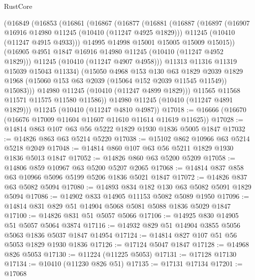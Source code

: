 \begin{lexlean}{RustCore}
\begin{coremodule}
          (@16849
            (@16853
              (@16861
                (@16867
                  (@16877
                    (@16881
                      (@16887
                        (@16897
                          (@16907 @16916 @14980 @11245 (@10410 (@11247 @4925 @1829)))
                          @11245
                          (@10410 (@11247 @4915 @4933)))
                        @14995
                        @14998
                        @15001
                        @15005
                        @15009
                        @15015))
                    (@16905 @4951 @1847 @16916 @14980 @11245 (@10410 (@11247 @4952 @1829)))
                    @11245
                    (@10410 (@11247 @4907 @4958)))
                  @11313
                  @11316
                  @11319
                  @15039
                  @15043
                  @11334)
                (@15050
                  @4968
                  @153
                  @130
                  @63
                  @1829
                  @2039
                  @1829
                  @1968
                  (@15060 @153 @63 @2039 (@15064 @152 @2039 @11545 @11549))
                  @15083)))
            @14980
            @11245
            (@10410 (@11247 @4899 @1829)))
          @11565
          @11568
          @11571
          @11575
          @11580
          @11586))
      @14980
      @11245
      (@10410 (@11247 @4891 @1829)))
    @11245
    (@10410 (@11247 @4810 @4987))
@17018 := @16666 (@16670 (@16676 @17009 @11604 @11607 @11610 @11614 @11619 @11625))
@17028 := @14814 @863 @107 @63 @56 @5222 @1829 @1930 @1836 @5005 @1847
@17032 := @14826 @863 @63 @5214 @5220
@17038 := @15102 @862 @10966 @63 @5214 @5218 @2049
@17048 := @14814 @860 @107 @63 @56 @5211 @1829 @1930 @1836 @5013 @1847
@17052 := @14826 @860 @63 @5200 @5209
@17058 := @14806 @859 @10967 @63 @5200 @5207 @2065
@17068 := @14814 @837 @858 @63 @10966 @5096 @5199 @5206 @1836 @5021 @1847
@17072 := @14826 @837 @63 @5082 @5094
@17080 := @14893 @834 @182 @130 @63 @5082 @5091 @1829 @5094
@17086 := @14902 @833 @14905 @11153 @5082 @5089 @1950
@17096 := @14814 @831 @829 @51 @14904 @5068 @5081 @5088 @1836 @5029 @1847
@17100 := @14826 @831 @51 @5057 @5066
@17106 := @14925 @830 @14905 @51 @5057 @5064 @3874
@17116 := @14932 @829 @51 @14904 @3855 @5056 @5063 @1836 @5037 @1847 @14954
@17124 := @14814 @827 @107 @51 @56 @5053 @1829 @1930 @1836
@17126 := @17124 @5047 @1847
@17128 := @14968 @826 @5053
@17130 := @11224 (@11225 @5053)
@17131 := @17128 @17130
@17134 := @10410 (@11230 @826 @51)
@17135 := @17131 @17134
@17201 := @17068

\end{coremodule}
\end{lexlean}
